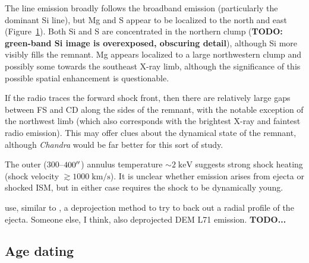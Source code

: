 \documentclass[preprint2,tighten,trackchanges]{aastex6}
\newcommand*{\mt}{\mathrm}
\newcommand*{\unit}[1]{\;\mt{#1}}  %
\newcommand*{\abt}{\mathord{\sim}} %
\begin{document}
The line emission broadly follows the broadband emission (particularly the
dominant Si line), but Mg and S appear to be localized to the north and east
(Figure~\ref{fig:rgb}).
Both Si and S are concentrated in the northern clump (\textbf{TODO:
green-band Si image is overexposed, obscuring detail}), although Si more
visibly fills the remnant.
Mg appears localized to a large northwestern clump and possibly some towards
the southeast X-ray limb, although the significance of this possible spatial
enhancement is questionable.

\begin{figure*}[!ht]
    \label{fig:rgb}
\end{figure*}

If the radio traces the forward shock front, then there are relatively
large gaps between FS and CD along the sides of the remnant, with the
notable exception of the northwest limb (which also corresponds with
the brightest X-ray and faintest radio emission).
This may offer clues about the dynamical state of the remnant, although
\textit{Chandra} would be far better for this sort of study.

The outer ($300$--$400\mbox{$^{\prime\prime}$}$) annulus temperature $\abt 2 \unit{keV}$
suggests strong shock heating (shock velocity $\gtrsim 1000 \unit{km/s}$).
It is unclear whether emission arises from ejecta or shocked ISM, but in either
case requires the shock to be dynamically young.

\citet{katsuda2015} use, similar to \citet{kosenko2010}, a deprojection method
to try to back out a radial profile of the ejecta.
Someone else, \citet{hughes2003} I think, also deprojected DEM L71 emission.
\textbf{TODO...}

\subsection{Age dating}
\end{document}
